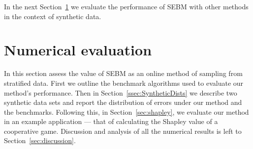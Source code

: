 





In the next Section~\ref{sec:application} we evaluate the performance of SEBM with other methods in the context of synthetic data.


\section{Numerical evaluation}\label{sec:application}

In this section assess the value of SEBM as an online method of sampling from stratified data.
First we outline the benchmark algorithms used to evaluate our method's performance.
Then in Section~\ref{ssec:SyntheticDists}
we describe two synthetic data sets and report the distribution of errors under our method and the benchmarks.
Following this, in Section~\ref{sec:shapley}, we evaluate our method in an example application --- that of calculating the Shapley value of a cooperative game.
Discussion and analysis of all the numerical results is left to Section~\ref{sec:discussion}.



